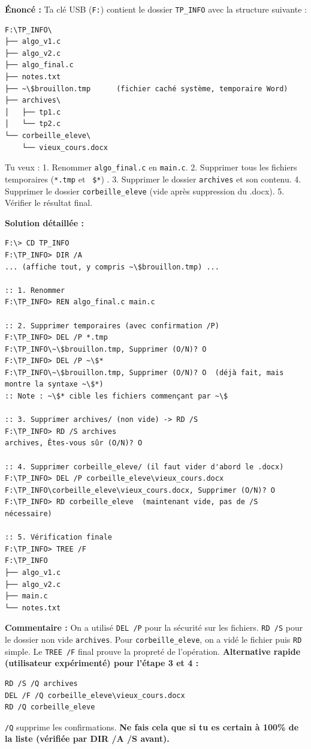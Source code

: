 \documentclass[11pt]{article}
\begin{document}
\begin{exoresolu}
\textbf{Énoncé :} Ta clé USB (\texttt{F:}) contient le dossier \texttt{TP\_INFO} avec la structure suivante :
\begin{lstlisting}
F:\TP_INFO\
├── algo_v1.c
├── algo_v2.c
├── algo_final.c
├── notes.txt
├── ~\$brouillon.tmp      (fichier caché système, temporaire Word)
├── archives\
│   ├── tp1.c
│   └── tp2.c
└── corbeille_eleve\
    └── vieux_cours.docx
\end{lstlisting}
Tu veux :
1. Renommer \texttt{algo\_final.c} en \texttt{main.c}.
2. Supprimer tous les fichiers temporaires (\texttt{*.tmp} et \texttt{~\$*}) .
3. Supprimer le dossier \texttt{archives} et son contenu.
4. Supprimer le dossier \texttt{corbeille\_eleve} (vide après suppression du .docx).
5. Vérifier le résultat final.

\textbf{Solution détaillée :}
\begin{lstlisting}
F:\> CD TP_INFO
F:\TP_INFO> DIR /A
... (affiche tout, y compris ~\$brouillon.tmp) ...

:: 1. Renommer
F:\TP_INFO> REN algo_final.c main.c

:: 2. Supprimer temporaires (avec confirmation /P)
F:\TP_INFO> DEL /P *.tmp
F:\TP_INFO\~\$brouillon.tmp, Supprimer (O/N)? O
F:\TP_INFO> DEL /P ~\$*
F:\TP_INFO\~\$brouillon.tmp, Supprimer (O/N)? O  (déjà fait, mais montre la syntaxe ~\$*)
:: Note : ~\$* cible les fichiers commençant par ~\$

:: 3. Supprimer archives/ (non vide) -> RD /S
F:\TP_INFO> RD /S archives
archives, Êtes-vous sûr (O/N)? O

:: 4. Supprimer corbeille_eleve/ (il faut vider d'abord le .docx)
F:\TP_INFO> DEL /P corbeille_eleve\vieux_cours.docx
F:\TP_INFO\corbeille_eleve\vieux_cours.docx, Supprimer (O/N)? O
F:\TP_INFO> RD corbeille_eleve  (maintenant vide, pas de /S nécessaire)

:: 5. Vérification finale
F:\TP_INFO> TREE /F
F:\TP_INFO
├── algo_v1.c
├── algo_v2.c
├── main.c
└── notes.txt
\end{lstlisting}
\textbf{Commentaire :} On a utilisé \texttt{DEL /P} pour la sécurité sur les fichiers. \texttt{RD /S} pour le dossier non vide \texttt{archives}. Pour \texttt{corbeille\_eleve}, on a vidé le fichier puis \texttt{RD} simple. Le \texttt{TREE /F} final prouve la propreté de l'opération.
\tcblower
\textbf{Alternative rapide (utilisateur expérimenté) pour l'étape 3 et 4 :}
\begin{lstlisting}
RD /S /Q archives
DEL /F /Q corbeille_eleve\vieux_cours.docx
RD /Q corbeille_eleve
\end{lstlisting}
\texttt{/Q} supprime les confirmations. \textbf{Ne fais cela que si tu es certain à 100\% de la liste (vérifiée par DIR /A /S avant).}
\end{exoresolu}
\end{document}
